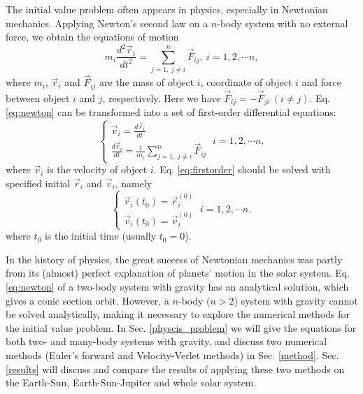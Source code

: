 The initial value problem often appears in physics, especially in Newtonian mechanics. 
Applying Newton's second law on a $n$-body system with no external force, we obtain the equations of motion 
\begin{equation}\label{eq:newton}
m_i\frac{d^2\vec{r}_i}{dt^2}=\sum_{j=1,\ j\neq i}^{n}\vec{F}_{ij},\ i=1,2,\cdots n, 
\end{equation}
where $m_i$, $\vec{r}_i$ and $\vec{F}_{ij}$ are the mass of object $i$, coordinate of object $i$ 
and force between object $i$ and $j$, respectively. 
Here we have $\vec{F}_{ij}=-\vec{F}_{ji}\ (i\neq j)$. 
Eq. \ref{eq:newton} can be transformed into a set of first-order differential equations: 
\begin{equation}\label{eq:firstorder}
	\left\{  
	\begin{array}{lr}  
	\vec{v}_i=\frac{d\vec{r}_i}{dt} \\
	\frac{d\vec{v}_i}{dt}=\frac{1}{m_i}\sum_{j=1,\ j\neq i}^{n}\vec{F}_{ij} 
	\end{array}  
	\right. 
	\ i=1,2,\cdots n, 
\end{equation}
where $\vec{v}_i$ is the velocity of object $i$. 
Eq. \ref{eq:firstorder} should be solved with specified initial $\vec{r}_i$ and $\vec{v}_i$, namely 
\begin{equation}
	\left\{  
	\begin{array}{lr}  
	\vec{r}_i(t_0)=\vec{r}^{(0)}_i \\
	\vec{v}_i(t_0)=\vec{v}^{(0)}_i
	\end{array}  
	\right. 
	\ i=1,2,\cdots n, 
\end{equation}
where $t_0$ is the initial time (usually $t_0=0$). 
\par
In the history of physics, the great success of Newtonian mechanics was partly from 
its (almost) perfect explanation of planets' motion in the solar system. 
Eq. \ref{eq:newton} of a two-body system with gravity has an analytical solution, 
which gives a conic section orbit. 
However, a $n$-body ($n>2$) system with gravity cannot be solved analytically, 
making it necessary to explore the numerical methods for the initial value problem. 
In Sec. \ref{physcis_problem} we will give the equations for both two- and many-body systems with gravity, 
and discuss two numerical methods (Euler's forward and Velocity-Verlet methods) in Sec. \ref{method}. 
Sec. \ref{results} will discuss and compare the results of applying
these two methods on the Earth-Sun, Earth-Sun-Jupiter and whole solar system. 